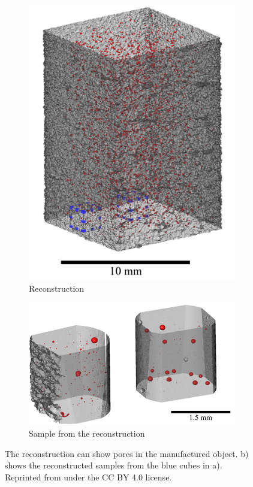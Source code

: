 \begin{figure}
  \centering
      \begin{subfigure}[b]{0.49\textwidth}
      \includegraphics[width=\textwidth]{../figures/literatureReview/literature_pores3D1.png}
      \caption{Reconstruction}
    \end{subfigure}
    \begin{subfigure}[b]{0.49\textwidth}
      \includegraphics[width=\textwidth]{../figures/literatureReview/literature_pores3D2.png}
      \caption{Sample from the reconstruction}
    \end{subfigure}
    \caption{The reconstruction can show pores in the manufactured object. b) shows the reconstructed samples from the blue cubes in a). Reprinted from \cite{tammas2015xct} under the CC BY 4.0 license.}
    \label{fig:literature_pores3D}
\end{figure}

